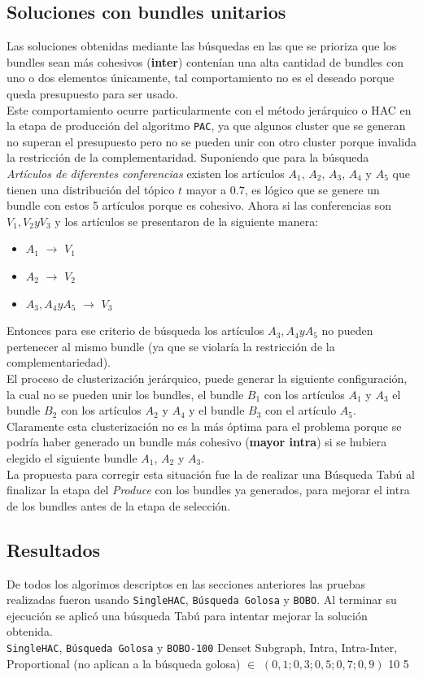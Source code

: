 \subsection{Soluciones con bundles unitarios}
Las soluciones obtenidas mediante las búsquedas en las que se prioriza que los bundles sean más cohesivos (\textbf{inter}) contenían una alta cantidad de bundles con uno o dos elementos únicamente, tal comportamiento no es el deseado porque queda presupuesto para ser usado.\\
Este comportamiento ocurre particularmente con el método jerárquico o HAC en la etapa de producción del algoritmo \texttt{PAC}, ya que algunos cluster que se generan no superan el presupuesto pero no se pueden unir con otro cluster porque invalida la restricción de la complementaridad. Suponiendo que para la búsqueda \textit{Artículos de diferentes conferencias} existen los artículos $A_1$, $A_2$, $A_3$, $A_4$ y $A_5$ que tienen una distribución del tópico $t$ mayor a $0.7$, es lógico que se genere un bundle con estos 5 artículos porque es cohesivo. Ahora si las conferencias son $V_1, V_2 y V_3$ y los artículos se presentaron de la siguiente manera:
\begin{itemize}
	\item $A_1$ $\rightarrow$ $V_1$
	\item $A_2$ $\rightarrow$ $V_2$
	\item $A_3, A_4 y A_5$ $\rightarrow$ $V_3$
\end{itemize} 

Entonces para ese criterio de búsqueda los artículos $A_3, A_4 y A_5$ no pueden pertenecer al mismo bundle (ya que se violaría la restricción de la complementariedad).\\
El proceso de clusterización jerárquico, puede generar la siguiente configuración, la cual no se pueden unir los bundles, el bundle $B_1$ con los artículos $A_1$ y $A_3$ el bundle $B_2$ con los artículos $A_2$ y $A_4$ y el bundle $B_3$ con el artículo $A_5$. Claramente esta clusterización no es la más óptima para el problema porque se podría haber generado un bundle más cohesivo (\textbf{mayor intra}) si se hubiera elegido el siguiente bundle $A_1$, $A_2$ y $A_3$.\\
La propuesta para corregir esta situación fue la de realizar una Búsqueda Tabú al finalizar la etapa del \textit{Produce} con los bundles ya generados, para mejorar el intra de los bundles antes de la etapa de selección.
\subsection{Resultados}
De todos los algorimos descriptos en las secciones anteriores las pruebas realizadas fueron usando \texttt{SingleHAC}, \texttt{Búsqueda Golosa} y \texttt{BOBO}. Al terminar su ejecución se aplicó una búsqueda Tabú para intentar mejorar la solución obtenida.\\
\Solucion
{}
{\texttt{SingleHAC}, \texttt{Búsqueda Golosa} y \texttt{BOBO-100}}
{Denset Subgraph, Intra, Intra-Inter, Proportional (no aplican a la búsqueda golosa)}
{$\in$ $(0,1; 0,3; 0,5; 0,7; 0,9)$}
{10}
{5}

